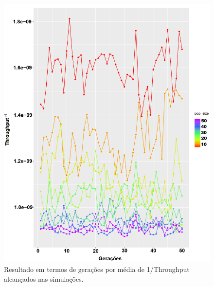\documentclass[conference]{IEEEtran}
\begin{document}
\begin{figure}[t]
  \centering
  \includegraphics[scale=0.24]{figures/GeracoesXThroughput.png}
  \caption{Resultado em termos de gerações por média de 1/Throughput alcançados nas simulações.}
  \label{fig:result-throughput}
\end{figure}
\end{document}
